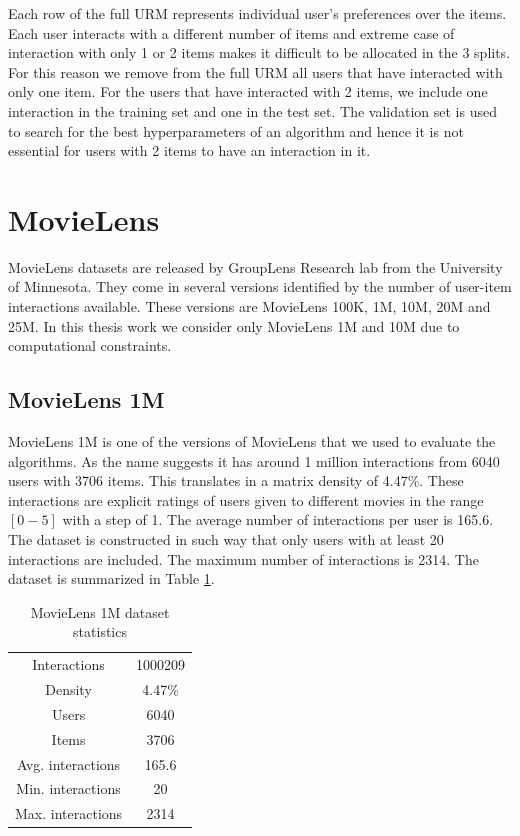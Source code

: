 Each row of the full URM represents individual user's preferences over the items. Each user interacts with a different number of items and extreme case of interaction with only 1 or 2 items makes it difficult to be allocated in the 3 splits. For this reason we remove from the full URM all users that have interacted with only one item. For the users that have interacted with 2 items, we include one interaction in the training set and one in the test set. The validation set is used to search for the best hyperparameters of an algorithm and hence it is not essential for users with 2 items to have an interaction in it.

\section{MovieLens}
MovieLens\cite{harper2015movielens} datasets are released by GroupLens Research lab from the University of Minnesota. They come in several versions identified by the number of user-item interactions available. These versions are MovieLens 100K, 1M, 10M, 20M and 25M. In this thesis work we consider only MovieLens 1M and 10M due to computational constraints.

\subsection{MovieLens 1M}
MovieLens 1M is one of the versions of MovieLens that we used to evaluate the algorithms. As the name suggests it has around 1 million interactions from 6040 users with 3706 items. This translates in a matrix density of 4.47\%. These interactions are explicit ratings of users given to different movies in the range $[0-5]$ with a step of 1. The average number of interactions per user is 165.6. The dataset is constructed in such way that only users with at least 20 interactions are included. The maximum number of interactions is 2314. The dataset is summarized in Table \ref{tab:ml1m_stats}.

\begin{table}[h!]
    \centering
    \begin{tabular}{c|c}
        \hline
        Interactions & 1000209 \\
        Density & 4.47\% \\
        Users & 6040 \\
        Items & 3706 \\
        Avg. interactions & 165.6 \\
        Min. interactions & 20 \\
        Max. interactions & 2314 \\
        \hline
    \end{tabular}
    \caption{MovieLens 1M dataset statistics}
    \label{tab:ml1m_stats}
\end{table}

